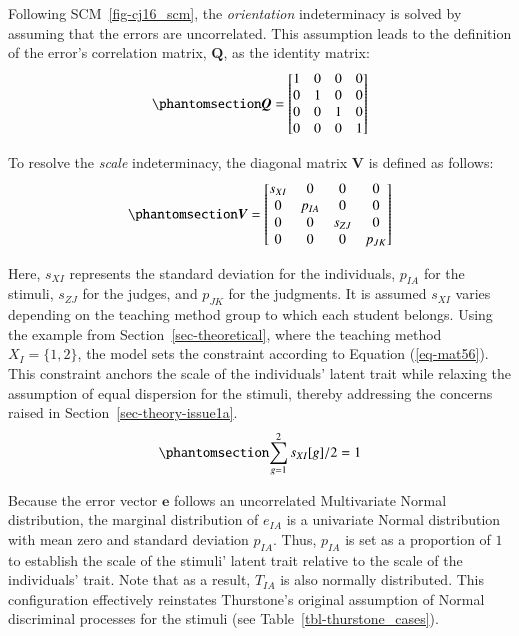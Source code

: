 \documentclass[
  authoryear,
  review,
  1p]{elsarticle}
\begin{document}
Following SCM~\ref{fig-cj16_scm}, the \emph{orientation} indeterminacy
is solved by assuming that the errors are uncorrelated. This assumption
leads to the definition of the error's correlation matrix,
\(\boldsymbol{Q}\), as the identity matrix:
\begin{equation}\phantomsection\label{eq-mat54}{
\boldsymbol{Q} = \begin{bmatrix}
    1 & 0 & 0 & 0 \\
    0 & 1 & 0 & 0 \\
    0 & 0 & 1 & 0 \\
    0 & 0 & 0 & 1 
  \end{bmatrix}
}\end{equation}

To resolve the \emph{scale} indeterminacy, the diagonal matrix
\(\boldsymbol{V}\) is defined as follows:
\begin{equation}\phantomsection\label{eq-mat55}{
\boldsymbol{V} = \begin{bmatrix}
    s_{XI} & 0 & 0 & 0 \\
    0 & p_{IA} & 0 & 0 \\
    0 & 0 & s_{ZJ} & 0 \\
    0 & 0 & 0 & p_{JK} 
  \end{bmatrix}
}\end{equation}

Here, \(s_{XI}\) represents the standard deviation for the individuals,
\(p_{IA}\) for the stimuli, \(s_{ZJ}\) for the judges, and \(p_{JK}\)
for the judgments. It is assumed \(s_{XI}\) varies depending on the
teaching method group to which each student belongs. Using the example
from Section~\ref{sec-theoretical}, where the teaching method
\(X_{I} = \{1,2\}\), the model sets the constraint according to Equation
(\ref{eq-mat56}). This constraint anchors the scale of the individuals'
latent trait while relaxing the assumption of equal dispersion for the
stimuli, thereby addressing the concerns raised in
Section~\ref{sec-theory-issue1a}.
\begin{equation}\phantomsection\label{eq-mat56}{
\sum_{g=1}^{2} s_{XI}[g]/2 = 1
}\end{equation}

Because the error vector \(\boldsymbol{e}\) follows an uncorrelated
Multivariate Normal distribution, the marginal distribution of
\(e_{IA}\) is a univariate Normal distribution with mean zero and
standard deviation \(p_{IA}\). Thus, \(p_{IA}\) is set as a proportion
of \(1\) to establish the scale of the stimuli' latent trait relative to
the scale of the individuals' trait. Note that as a result, \(T_{IA}\)
is also normally distributed. This configuration effectively reinstates
Thurstone's original assumption of Normal discriminal processes for the
stimuli (see Table~\ref{tbl-thurstone_cases}).
\end{document}
